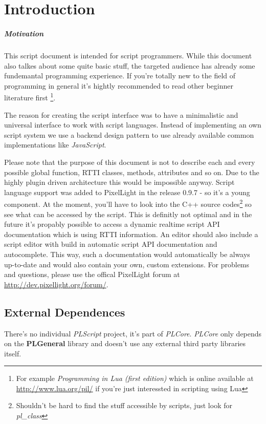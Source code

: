 \chapter{Introduction}


\paragraph{Motivation}
This script document is intended for script programmers. While this document also talkes about some quite basic stuff, the targeted audience has already some fundemantal programming experience. If you're totally new to the field of programming in general it's hightly recommended to read other beginner literature first \footnote{For example \emph{Programming in Lua (first edition)} which is online available at \url{http://www.lua.org/pil/} if you're just interessted in scripting using Lua}.

The reason for creating the script interface was to have a minimalistic and universal interface to work with script languages. Instead of implementing an own script system we use a backend design pattern to use already available common implementations like \emph{JavaScript}.

Please note that the purpose of this document is not to describe each and every possible global function, RTTI classes, methods, attributes and so on. Due to the highly plugin driven architecture this would be impossible anyway. Script language support was added to PixelLight in the release 0.9.7 - so  it's a young component. At the moment, you'll have to look into the C++ source codes\footnote{Shouldn't be hard to find the stuff accessible by scripts, just look for \emph{pl\_class}} so see what can be accessed by the script. This is definitly not optimal and in the future it's propably possible to access a dynamic realtime script API documentation which is using RTTI information. An editor should also include a script editor with build in automatic script API documentation and autocomplete. This way, such a documentation would automatically be always up-to-date and would also contain your own, custom extensions. For problems and questions, please use the offical PixelLight forum at \url{http://dev.pixellight.org/forum/}.




\section{External Dependences}
There's no individual \emph{PLScript} project, it's part of \emph{PLCore}. \emph{PLCore} only depends on the \textbf{PLGeneral} library and doesn't use any external third party libraries itself.
